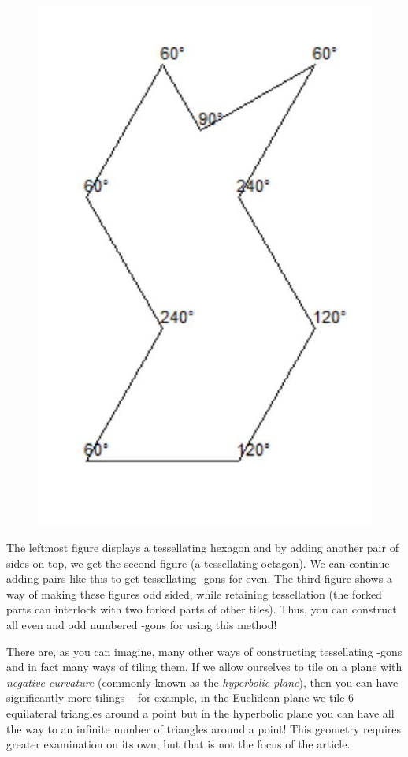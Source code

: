 \begin{figure}[htbp]
\centering
\includegraphics{image_5.jpg}
\caption{}
\end{figure}

The leftmost figure displays a tessellating hexagon and by adding
another pair of sides on top, we get the second figure (a tessellating
octagon). We can continue adding pairs like this to get tessellating
-gons for even. The third figure shows a way of making these figures odd
sided, while retaining tessellation (the forked parts can interlock with
two forked parts of other tiles). Thus, you can construct all even and
odd numbered -gons for using this method!

There are, as you can imagine, many other ways of constructing
tessellating -gons and in fact many ways of tiling them. If we allow
ourselves to tile on a plane with \emph{negative curvature} (commonly
known as the \emph{hyperbolic plane}), then you can have significantly
more tilings -- for example, in the Euclidean plane we tile 6
equilateral triangles around a point but in the hyperbolic plane you can
have all the way to an infinite number of triangles around a point! This
geometry requires greater examination on its own, but that is not the
focus of the article.

